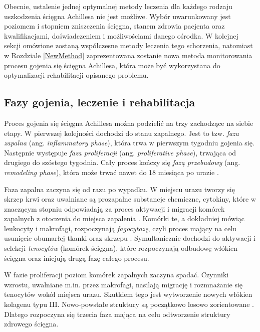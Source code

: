 Obecnie, ustalenie jednej optymalnej metody leczenia dla każdego rodzaju uszkodzenia ścięgna Achillesa nie jest możliwe. Wybór uwarunkowany jest poziomem i stopniem zniszczenia ścięgna, stanem zdrowia pacjenta oraz kwalifikacjami, doświadczeniem i możliwościami danego ośrodka. W kolejnej sekcji omówione zostaną współczesne metody leczenia tego schorzenia, natomiast w Rozdziale \ref{NewMethod} zaprezentowana zostanie nowa metoda monitorowania procesu gojenia się ścięgna Achillesa, która może być wykorzystana do optymalizacji rehabilitacji opisanego problemu. 

\subsection{Fazy gojenia, leczenie i rehabilitacja}
\label{gojenie}

Proces gojenia się ścięgna Achillesa można podzielić na trzy zachodzące na siebie etapy. W pierwszej kolejności dochodzi do stanu zapalnego. Jest to tzw. \textit{faza zapalna} (ang. \textit{inflammatory phase}), która trwa w pierwszym tygodniu gojenia się. Następnie występuje \textit{faza proliferacji} (ang. \textit{proliferative phase}), trwająca od drugiego do szóstego tygodnia. Cały proces kończy się \textit{fazą przebudowy} (ang. \textit{remodeling phase}), która może trwać nawet do 18 miesiąca po urazie \cite{Sharma2006, Yang2013, Docheva2015, CMC}. 

Faza zapalna zaczyna się od razu po wypadku. W miejscu urazu tworzy się skrzep krwi oraz uwalniane są prozapalne substancje chemiczne, cytokiny, które w znaczącym stopniu odpowiadają za proces aktywacji i migracji komórek zapalnych z otoczenia do miejsca zapalenia \cite{Lin2004}. Komórki te, a dokładniej mówiąc leukocyty i makrofagi, rozpoczynają \textit{fagocytozę}, czyli proces mający na celu usunięcie obumarłej tkanki oraz skrzepu \cite{Yang2013, Beredjiklian2003, Lin2004}. Symultanicznie dochodzi do aktywacji i selekcji \textit{tenocytów} (komórek ścięgna), które rozpoczynają odbudowę włókien ścięgna \cite{Yang2013} oraz inicjują drugą fazę całego procesu.

W fazie proliferacji poziom komórek zapalnych zaczyna spadać. Czynniki wzrostu, uwalniane m.in. przez makrofagi, nasilają migrację i rozmnażanie się tenocytów wokół miejsca urazu. Skutkiem tego jest wytworzenie nowych włókien kolagenu typu III. Nowo-powstałe struktury są początkowo losowo zorientowane \cite{Yang2013, Beredjiklian2003, Docheva2015}. Dlatego rozpoczyna się trzecia faza mająca na celu odtworzenie struktury zdrowego ścięgna.

